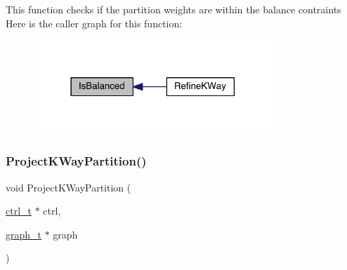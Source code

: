 This function checks if the partition weights are within the balance contraints Here is the caller graph for this function\+:\nopagebreak
\begin{figure}[H]
\begin{center}
\leavevmode
\includegraphics[width=254pt]{a00915_ae2f5446999d83461cf5763dc4946182a_icgraph}
\end{center}
\end{figure}
\mbox{\label{a00915_a974cb62c010e195c90f8fb900359957c}} 
\subsubsection{\texorpdfstring{Project\+K\+Way\+Partition()}{ProjectKWayPartition()}}
{\footnotesize\ttfamily void Project\+K\+Way\+Partition (\begin{DoxyParamCaption}\item[{\hyperlink{a00742}{ctrl\+\_\+t} $\ast$}]{ctrl,  }\item[{\hyperlink{a00734}{graph\+\_\+t} $\ast$}]{graph }\end{DoxyParamCaption})}

